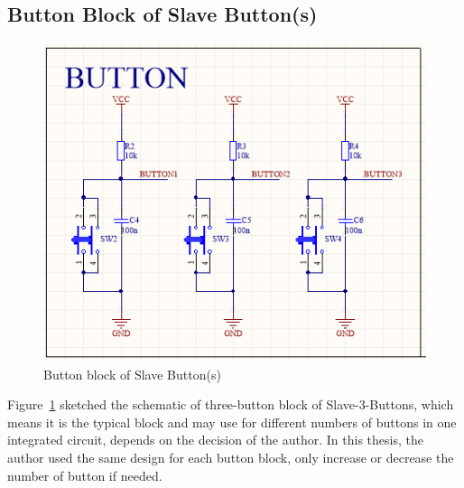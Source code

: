   \subsection{Button Block of Slave Button(s)} 
  \begin{figure}[!ht]
    \begin{center}
    \includegraphics[scale=1]{images/button.png}
    \caption{Button block of Slave Button(s)}
    \label{fig:buttonBlock}
    \end{center}
  \end{figure}
  Figure~\ref{fig:buttonBlock} sketched the schematic of three-button block of Slave-3-Buttons, which means it is the typical block and may use for different numbers of buttons in one integrated circuit, depends on the decision of the author. In this thesis, the author used the same design for each button block, only increase or decrease the number of button if needed.

